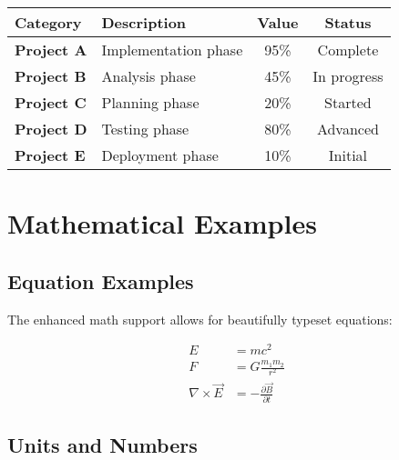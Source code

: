 \documentclass[a4paper,11pt]{article}
\begin{document}
\begin{tcolorbox}[colback=cardbg, colframe=frameborder, coltitle=white,
    fonttitle=\bfseries, title=📊 Data Analysis Results,
    enhanced, boxrule=0.5pt, arc=4pt, left=10pt, right=10pt, top=8pt, bottom=8pt,
    attach boxed title to top left={xshift=10pt, yshift=-2mm},
    boxed title style={colback=accent, arc=2pt}
]


\begin{tabularx}{\linewidth}{>{\raggedright\arraybackslash\bfseries}X >{\raggedright\arraybackslash}X c c}
    \rowcolor{headerbg}
    \textcolor{headertext}{Category} &
    \textcolor{headertext}{Description} &
    \textcolor{headertext}{Value} &
    \textcolor{headertext}{Status} \\
    \toprule
    Project A & Implementation phase & 95\% & Complete  \\
    Project B & Analysis phase & 45\% & In progress \\
    Project C & Planning phase & 20\% & Started \\
    Project D & Testing phase & 80\% & Advanced \\
    Project E & Deployment phase & 10\% & Initial \\
    \bottomrule
\end{tabularx}

\end{tcolorbox}

\section{Mathematical Examples}
\label{sec:math}

\subsection{Equation Examples}

The enhanced math support allows for beautifully typeset equations:

\begin{align}
E &= mc^2 \\
F &= G\frac{m_1 m_2}{r^2} \\
\nabla \times \vec{E} &= -\frac{\partial \vec{B}}{\partial t}
\end{align}

\subsection{Units and Numbers}
\end{document}
